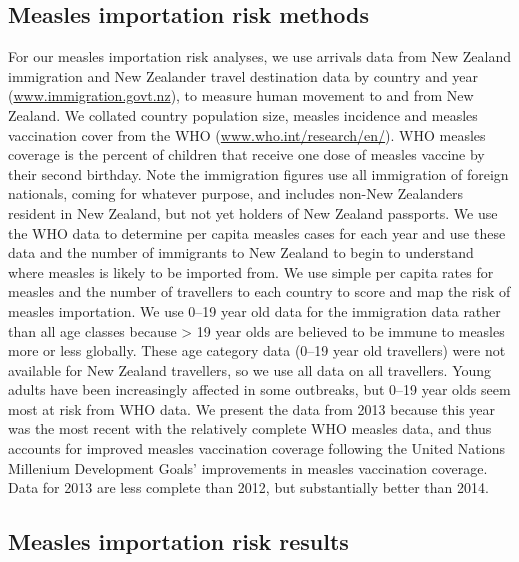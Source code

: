 \documentclass{article}
\begin{document}
\subsection{Measles importation risk methods}
\label{sub:imp_risk}
For our measles importation risk analyses, we use arrivals data from New Zealand immigration and New Zealander travel destination data by country and year (\href{http://www.immigration.govt.nz/}{www.immigration.govt.nz}), to measure human movement to and from New Zealand. We collated country population size, measles incidence and measles vaccination cover from the WHO (\href{http://www.who.int/research/en/}{www.who.int/research/en/}). WHO measles coverage is the percent of children that receive one dose of measles vaccine by their second birthday. Note the immigration figures use all immigration of foreign nationals, coming for whatever purpose, and includes non-New Zealanders resident in New Zealand, but not yet holders of New Zealand passports. We use the WHO data to determine per capita measles cases for each year and use these data and the number of immigrants to New Zealand to begin to understand where measles is likely to be imported from. We use simple per capita rates for measles and the number of travellers to each country to score and map the risk of measles importation. We use 0--19 year old data for the immigration data rather than all age classes because > 19 year olds are believed to be immune to measles more or less globally. These age category data (0--19 year old travellers) were not available for New Zealand travellers, so we use all data on all travellers. Young adults have been increasingly affected in some outbreaks, but 0--19 year olds seem most at risk from WHO data. We present the data from 2013 because this year was the most recent with the relatively complete WHO measles data, and thus accounts for improved measles vaccination coverage following the United Nations Millenium Development Goals' improvements in measles vaccination coverage. Data for 2013 are less complete than 2012, but substantially better than 2014.

\subsection{Measles importation risk results}
\end{document}
